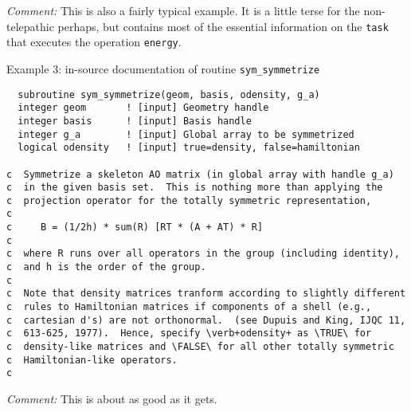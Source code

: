 {\em Comment:} This is also a fairly typical example.  It is a little terse for the non-telepathic
perhaps, but contains most of the essential information on the
{\tt task} that executes the operation {\tt energy}.



Example 3: in-source documentation of routine {\tt sym\_symmetrize}

\begin{verbatim}
  subroutine sym_symmetrize(geom, basis, odensity, g_a)
  integer geom       ! [input] Geometry handle
  integer basis      ! [input] Basis handle
  integer g_a        ! [input] Global array to be symmetrized
  logical odensity   ! [input] true=density, false=hamiltonian

c  Symmetrize a skeleton AO matrix (in global array with handle g_a)
c  in the given basis set.  This is nothing more than applying the
c  projection operator for the totally symmetric representation,
c  
c     B = (1/2h) * sum(R) [RT * (A + AT) * R]
c
c  where R runs over all operators in the group (including identity),
c  and h is the order of the group.
c  
c  Note that density matrices tranform according to slightly different
c  rules to Hamiltonian matrices if components of a shell (e.g.,
c  cartesian d's) are not orthonormal.  (see Dupuis and King, IJQC 11,
c  613-625, 1977).  Hence, specify \verb+odensity+ as \TRUE\ for
c  density-like matrices and \FALSE\ for all other totally symmetric
c  Hamiltonian-like operators.
c  
\end{verbatim}


{\em Comment:} This is about as good as it gets.
